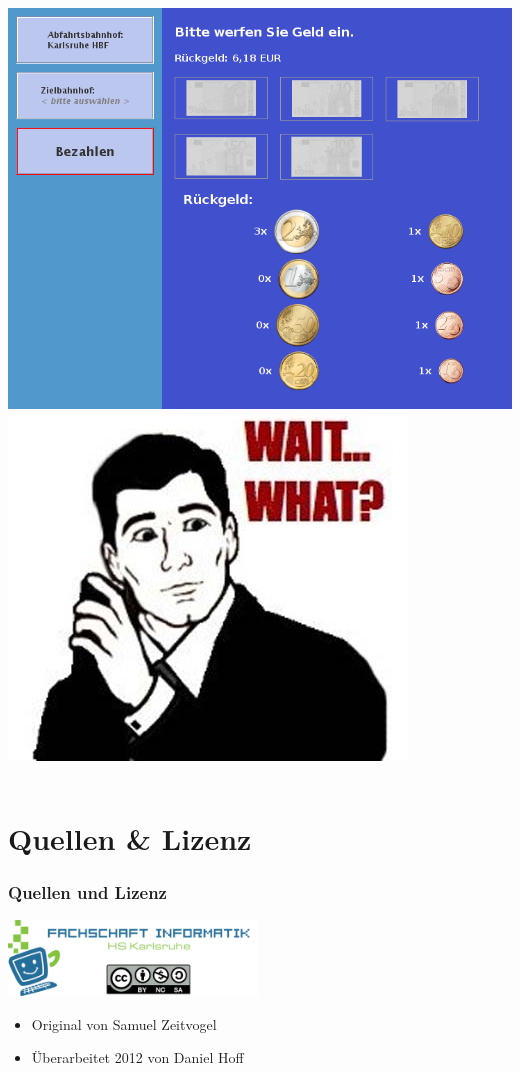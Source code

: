 \documentclass[final]{beamer}
\begin{document}
\begin{frame}
	\begin{columns}[T]
			\includegraphics[width=\textwidth]{gfx/bahnticketautomat_rueckgeld}
		\pause
			\includegraphics[width=\textwidth]{gfx/Wait-what-meme-rage-face.jpg}
	\end{columns}
	
\end{frame}

\section{Quellen \& Lizenz}
\begin{frame}
	\frametitle{Quellen und Lizenz}
	\begin{center}
		\includegraphics[width=250px]{gfx/fsi}
	\end{center}
	\begin{itemize}
		\item{Original von Samuel Zeitvogel}
		\item{Überarbeitet 2012 von Daniel Hoff}
	\end{itemize}
\end{frame}
\end{document}
